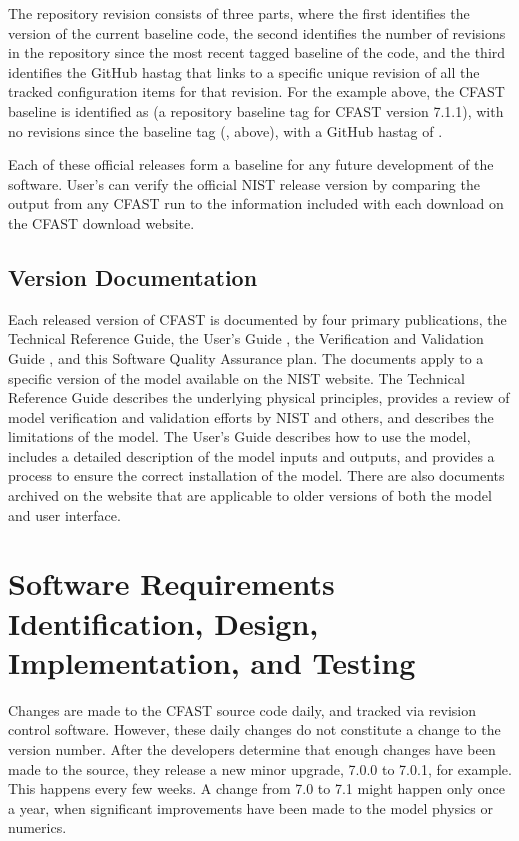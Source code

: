 \documentclass[12pt]{book}
\begin{document}
The repository revision consists of three parts, where the first identifies the version of the current baseline code, the second identifies the number of revisions in the repository since the most recent tagged baseline of the code, and the third identifies the GitHub hastag that links to a specific unique revision of all the tracked configuration items for that revision. For the example above, the CFAST baseline is identified as  (a repository baseline tag for CFAST version 7.1.1), with no revisions since the baseline tag (, above), with a GitHub hastag of .

Each of these official releases form a baseline for any future development of the software. User's can verify the official NIST release version by comparing the output from any CFAST run to the information included with each download on the CFAST download website.

\section{Version Documentation}

Each released version of CFAST is documented by four primary publications, the Technical Reference Guide\cite{CFAST_Tech_Guide_7}, the User's Guide \cite{CFAST_Users_Guide_7}, the Verification and Validation Guide \cite{CFAST_Valid_Guide_7}, and this Software Quality Assurance plan. The documents apply to a specific version of the model available on the NIST website. The Technical Reference Guide describes the underlying physical principles, provides a review of model verification and validation efforts by NIST and others, and describes the limitations of the model.  The User's Guide describes how to use the model, includes a detailed description of the model inputs and outputs, and provides a process to ensure the correct installation of the model. There are also documents archived on the website that are applicable to older versions of both the model and user interface.

\chapter{Software Requirements Identification, Design, Implementation, and Testing}

Changes are made to the CFAST source code daily, and tracked via revision control software. However, these daily changes do not constitute a change to the version number. After the developers determine that enough changes have been made to the source, they release a new minor upgrade, 7.0.0 to 7.0.1, for example. This happens every few weeks. A change from 7.0 to 7.1 might happen only once a year, when significant improvements have been made to the model physics or numerics.
\end{document}
